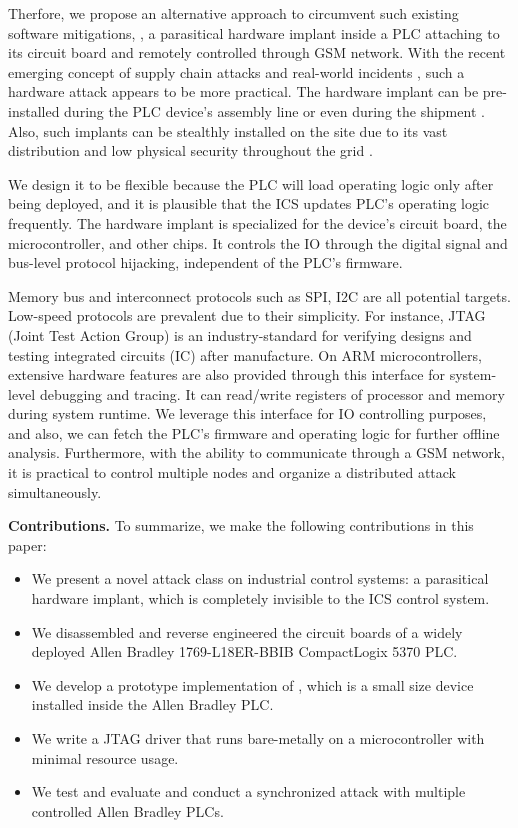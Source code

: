 
Therfore, we propose an alternative approach to circumvent such existing software mitigations, \name, a parasitical hardware implant inside a PLC attaching to its circuit board and remotely controlled through GSM network.  With the recent emerging concept of supply chain attacks and real-world incidents \cite{oxfordsolarwinds}, such a hardware attack appears to be more practical. The hardware implant can be pre-installed during the PLC device's assembly line or even during the shipment \cite{robertson2018big}. Also, such implants can be stealthly installed on the site due to its vast distribution and low physical security throughout the grid \cite{Loopholes2020}.


We design it to be flexible because the PLC will load operating logic only after being deployed, and it is plausible that the ICS updates PLC's operating logic frequently. The hardware implant is specialized for the device's circuit board, the microcontroller, and other chips.  It controls the IO through the digital signal and bus-level protocol hijacking, independent of the PLC's firmware.

Memory bus and interconnect protocols such as SPI, I2C are all potential targets. Low-speed protocols are prevalent due to their simplicity. For instance, JTAG (Joint Test Action Group) is an industry-standard for verifying designs and testing integrated circuits (IC) after manufacture. 	On ARM microcontrollers, extensive hardware features are also provided through this interface for system-level debugging and tracing. It can read/write registers of processor and memory during system runtime. We leverage this interface for IO controlling purposes, and also, we can fetch the PLC's firmware and operating logic for further offline analysis. Furthermore, with the ability to communicate through a GSM network, it is practical to control multiple nodes and organize a distributed attack simultaneously.



\textbf{Contributions.} To summarize, we make the following contributions in this paper:
\begin{itemize}[leftmargin=*]
	\item We present a novel attack class on industrial control systems: a parasitical hardware implant, which is completely invisible to the ICS control system.
	\item We disassembled and reverse engineered the circuit boards of a widely deployed Allen Bradley 1769-L18ER-BBIB CompactLogix 5370 PLC. 
	\item We develop a prototype implementation of \name, which is a small size device installed inside the Allen Bradley PLC. 
	\item We write a JTAG driver that runs bare-metally on a microcontroller with minimal resource usage.
	\item We test and evaluate \name and conduct a synchronized attack with multiple controlled Allen Bradley PLCs. 
\end{itemize}

